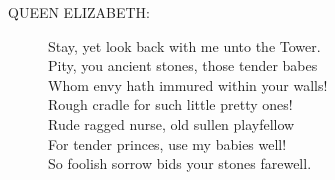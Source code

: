 \documentclass{article}
\begin{document}
\begin{description}
\item[QUEEN ELIZABETH:] 
\hspace{1pt}Stay, yet look back with me unto the Tower.\\
\hspace{1pt}Pity, you ancient stones, those tender babes\\
\hspace{1pt}Whom envy hath immured within your walls!\\
\hspace{1pt}Rough cradle for such little pretty ones!\\
\hspace{1pt}Rude ragged nurse, old sullen playfellow\\
\hspace{1pt}For tender princes, use my babies well!\\
\hspace{1pt}So foolish sorrow bids your stones farewell.\\
\end{description}
\centering{\it [Exeunt]}\\
\end{document}

